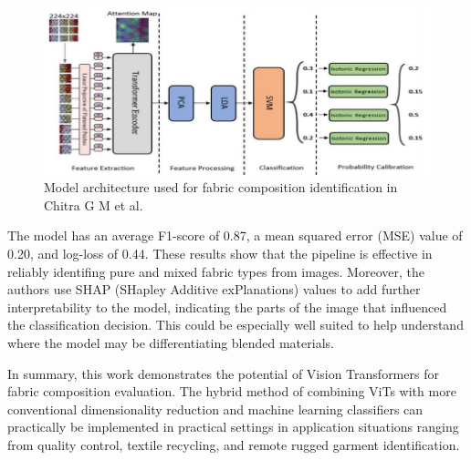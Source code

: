 \begin{figure}[H]
    \centering
    \begin{minipage}{1\linewidth}
        \includegraphics[width=\linewidth]{images/Paper3Model.png}
    \end{minipage}
    \caption[Model architecture - Chitra G M et al.~\cite{chitra2023fabric}]{Model architecture used for fabric composition identification in Chitra G M et al.~\cite{chitra2023fabric}}
\end{figure}

The model has an average F1-score of 0.87, a mean squared error (MSE) value of 0.20, and log-loss of 0.44. These results show that the pipeline is effective in reliably identifing pure and mixed fabric types from images. Moreover, the authors use SHAP (SHapley Additive exPlanations) values to add further interpretability to the model, indicating the parts of the image that influenced the classification decision. This could be especially well suited to help understand where the model may be differentiating blended materials. 

In summary, this work demonstrates the potential of Vision Transformers for fabric composition evaluation. The hybrid method of combining ViTs with more conventional dimensionality reduction and machine learning classifiers can practically be implemented in practical settings in application situations ranging from quality control, textile recycling, and remote rugged garment identification.
